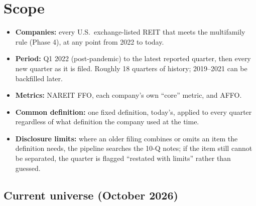 \documentclass[11pt]{article}
\begin{document}
\begin{center}
\small
{}
\end{center}

\section{Scope}

\begin{itemize}[itemsep=2pt]
  \item \textbf{Companies:} every U.S.\ exchange-listed REIT that meets the
        multifamily rule (Phase 4), at any point from 2022 to today.
  \item \textbf{Period:} Q1 2022 (post-pandemic) to the latest reported quarter, then every new
        quarter as it is filed. Roughly 18 quarters of history; 2019--2021 can be backfilled later.
  \item \textbf{Metrics:} NAREIT FFO, each company's own ``core'' metric, and AFFO.
  \item \textbf{Common definition:} one fixed definition, today's, applied to
        every quarter regardless of what definition the company used at the time.
  \item \textbf{Disclosure limits:} where an older filing combines or omits an
        item the definition needs, the pipeline searches the 10-Q notes; if the
        item still cannot be separated, the quarter is flagged ``restated with
        limits'' rather than guessed.
\end{itemize}

\subsection*{Current universe (October 2026)}
\end{document}
